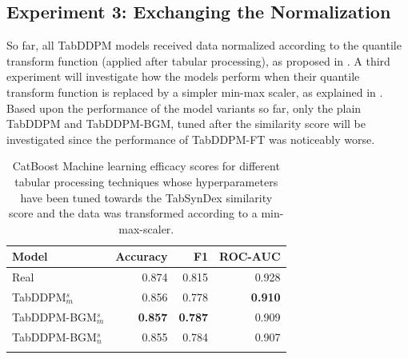 \subsection{Experiment 3: Exchanging the Normalization}
\label{ch:Experiment-3}

So far, all TabDDPM models received data normalized according to the quantile transform function (applied after tabular processing), as proposed in \cite{kotelnikov2022TabDDPMModellingTabular}.
A third experiment will investigate how the models perform when their quantile transform function is replaced by a simpler min-max scaler, as explained in .
Based upon the performance of the model variants so far, only the plain TabDDPM and TabDDPM-BGM, tuned after the similarity score will be investigated since the performance of
TabDDPM-FT was noticeably worse.

\begin{table}[h]
	\centering
	\begin{tabular}{lrrr}
		\toprule
		\textbf{Model}        & \textbf{Accuracy} & \textbf{F1}    & \textbf{ROC-AUC} \\
		\midrule
		Real                  & 0.874              & 0.815          & 0.928            \\
		TabDDPM$^{s}_{m}$     & 0.856              & 0.778          & \textbf{0.910}   \\
		TabDDPM-BGM$^{s}_{m}$ & \textbf{0.857}     & \textbf{0.787} & 0.909            \\
		TabDDPM-BGM$^{s}_{n}$ & 0.855              & 0.784          & 0.907            \\
		\bottomrule
		\multicolumn{4}{c}{}\\[-0.6em]
	\end{tabular}
	\caption[Experiment 3 ML-Efficacy]{CatBoost Machine learning efficacy scores for different tabular processing techniques whose hyperparameters have been tuned towards the TabSynDex similarity score
		and the data was transformed according to a min-max-scaler.}
	\label{tab:exp3-ml}
\end{table}


